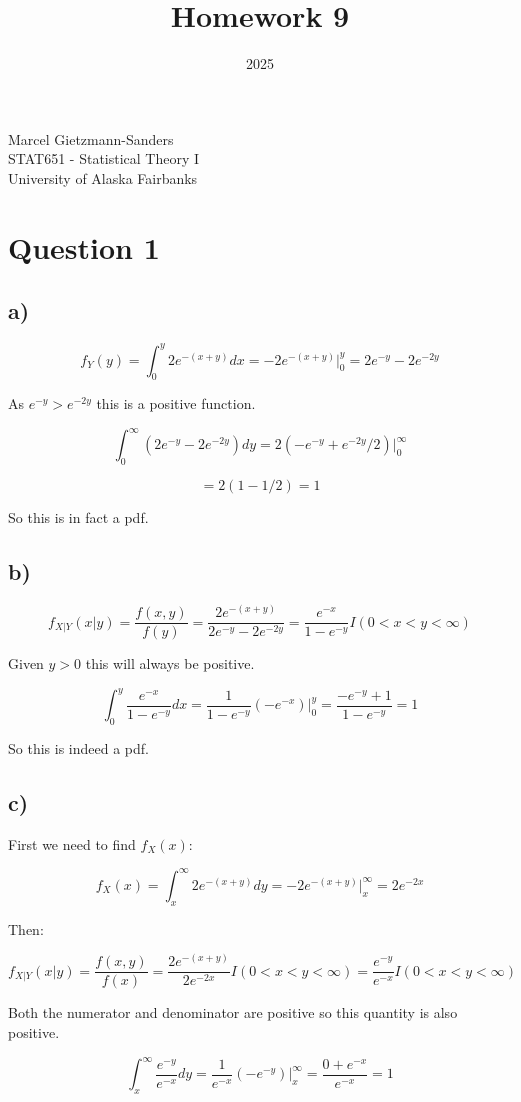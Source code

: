 \documentclass[11pt]{article}
\title{Homework 9}
\date{2025}
\makeatletter
\renewcommand{\maketitle}{
\begin{center}

\pagestyle{empty}

{\Large \bf \@title\par}
\vspace{1cm}

{\LARGE Marcel Gietzmann-Sanders}\\[1cm]

STAT651 - Statistical Theory I \\
University of Alaska Fairbanks


\end{center}
}\makeatother
\makeatother
\begin{document}
\maketitle


\section*{Question 1}

\subsection*{a)}

$$f_Y(y) = \int_0^y 2e^{-(x+y)}dx=-2e^{-(x+y)}\Big|_0^y=2e^{-y}-2e^{-2y}$$

As $e^{-y}>e^{-2y}$ this is a positive function. 

$$\int_0^{\infty}\left( 2e^{-y}-2e^{-2y} \right)dy =2\left( -e^{-y}+e^{-2y}/2 \right)\Big|_0^{\infty}$$

$$=2\left(1 - 1/2 \right)=1$$

So this is in fact a pdf. 

\subsection*{b)}

$$f_{X|Y}(x|y)=\frac{f(x,y)}{f(y)}=\frac{2e^{-(x+y)}}{2e^{-y}-2e^{-2y}}=\frac{e^{-x}}{1-e^{-y}}I(0<x<y<\infty)$$

Given $y>0$ this will always be positive. 

$$\int_0^{y} \frac{e^{-x}}{1-e^{-y}} dx = \frac{1}{1-e^{-y}} \left(-e^{-x} \right)\Big|_0^y=\frac{-e^{-y}+1}{1-e^{-y}}=1$$

So this is indeed a pdf. 

\subsection*{c)}

First we need to find $f_X(x)$:

$$f_X(x)=\int_x^{\infty}2e^{-(x+y)}dy=-2e^{-(x+y)}\Big|_x^{\infty}=2e^{-2x}$$

Then:

$$f_{X|Y}(x|y)=\frac{f(x,y)}{f(x)}=\frac{2e^{-(x+y)}}{2e^{-2x}}I(0<x<y<\infty)=\frac{e^{-y}}{e^{-x}}I(0<x<y<\infty)$$

Both the numerator and denominator are positive so this quantity is also positive. 

$$\int_x^{\infty}\frac{e^{-y}}{e^{-x}}dy=\frac{1}{e^{-x}}\left( -e^{-y}\right)\Big|_x^{\infty}=\frac{0+e^{-x}}{e^{-x}}=1$$
\end{document}
